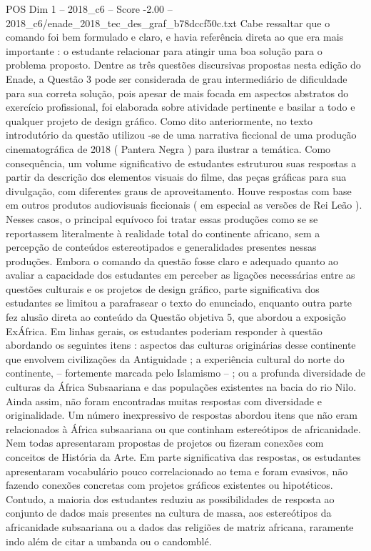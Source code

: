\begin{textsample}{POS Dim 1 – 2018\_c6 – Score -2.00 – 2018\_c6/enade\_2018\_tec\_des\_graf\_b78dccf50c.txt}
Cabe ressaltar que o comando foi bem formulado e claro, e havia referência direta ao que era mais importante : o estudante relacionar para atingir uma boa solução para o problema proposto.
Dentre as três questões discursivas propostas nesta edição do Enade, a Questão 3 pode ser considerada de grau intermediário de dificuldade para sua correta solução, pois apesar de mais focada em aspectos abstratos do exercício profissional, foi elaborada sobre atividade pertinente e basilar a todo e qualquer projeto de design gráfico.
Como dito anteriormente, no texto introdutório da questão utilizou -se de uma narrativa ficcional de uma produção cinematográfica de 2018 ( Pantera Negra ) para ilustrar a temática.
Como consequência, um volume significativo de estudantes estruturou suas respostas a partir da descrição dos elementos visuais do filme, das peças gráficas para sua divulgação, com diferentes graus de aproveitamento.
Houve respostas com base em outros produtos audiovisuais ficcionais ( em especial as versões de Rei Leão ).
Nesses casos, o principal equívoco foi tratar essas produções como se se reportassem literalmente à realidade total do continente africano, sem a percepção de conteúdos estereotipados e generalidades presentes nessas produções.
Embora o comando da questão fosse claro e adequado quanto ao avaliar a capacidade dos estudantes em perceber as ligações necessárias entre as questões culturais e os projetos de design gráfico, parte significativa dos estudantes se limitou a parafrasear o texto do enunciado, enquanto outra parte fez alusão direta ao conteúdo da Questão objetiva 5, que abordou a exposição ExÁfrica.
Em linhas gerais, os estudantes poderiam responder à questão abordando os seguintes itens : aspectos das culturas originárias desse continente que envolvem civilizações da Antiguidade ; a experiência cultural do norte do continente, – fortemente marcada pelo Islamismo – ; ou a profunda diversidade de culturas da África Subsaariana e das populações existentes na bacia do rio Nilo.
Ainda assim, não foram encontradas muitas respostas com diversidade e originalidade.
Um número inexpressivo de respostas abordou itens que não eram relacionados à África subsaariana ou que continham estereótipos de africanidade.
Nem todas apresentaram propostas de projetos ou fizeram conexões com conceitos de História da Arte.
Em parte significativa das respostas, os estudantes apresentaram vocabulário pouco correlacionado ao tema e foram evasivos, não fazendo conexões concretas com projetos gráficos existentes ou hipotéticos.
Contudo, a maioria dos estudantes reduziu as possibilidades de resposta ao conjunto de dados mais presentes na cultura de massa, aos estereótipos da africanidade subsaariana ou a dados das religiões de matriz africana, raramente indo além de citar a umbanda ou o candomblé.

\end{textsample}
